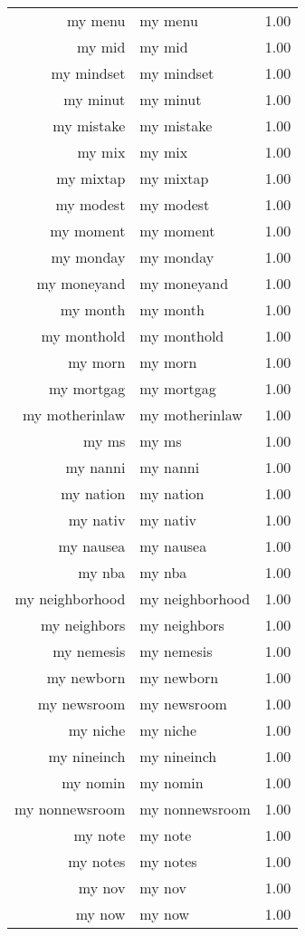 \begin{table}[ht]
\begin{tabular}{rlr}
  my menu & my menu & 1.00 \\ 
  my mid & my mid & 1.00 \\ 
  my mindset & my mindset & 1.00 \\ 
  my minut & my minut & 1.00 \\ 
  my mistake & my mistake & 1.00 \\ 
  my mix & my mix & 1.00 \\ 
  my mixtap & my mixtap & 1.00 \\ 
  my modest & my modest & 1.00 \\ 
  my moment & my moment & 1.00 \\ 
  my monday & my monday & 1.00 \\ 
  my moneyand & my moneyand & 1.00 \\ 
  my month & my month & 1.00 \\ 
  my monthold & my monthold & 1.00 \\ 
  my morn & my morn & 1.00 \\ 
  my mortgag & my mortgag & 1.00 \\ 
  my motherinlaw & my motherinlaw & 1.00 \\ 
  my ms & my ms & 1.00 \\ 
  my nanni & my nanni & 1.00 \\ 
  my nation & my nation & 1.00 \\ 
  my nativ & my nativ & 1.00 \\ 
  my nausea & my nausea & 1.00 \\ 
  my nba & my nba & 1.00 \\ 
  my neighborhood & my neighborhood & 1.00 \\ 
  my neighbors & my neighbors & 1.00 \\ 
  my nemesis & my nemesis & 1.00 \\ 
  my newborn & my newborn & 1.00 \\ 
  my newsroom & my newsroom & 1.00 \\ 
  my niche & my niche & 1.00 \\ 
  my nineinch & my nineinch & 1.00 \\ 
  my nomin & my nomin & 1.00 \\ 
  my nonnewsroom & my nonnewsroom & 1.00 \\ 
  my note & my note & 1.00 \\ 
  my notes & my notes & 1.00 \\ 
  my nov & my nov & 1.00 \\ 
  my now & my now & 1.00 \\ 

\end{tabular}
\end{table}

